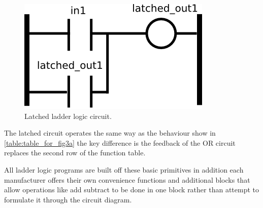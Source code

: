 \begin{figure}[h]
    \centering
    \includegraphics[width=\imgsmall]{./images/intro_fig_latched.png} 
    \caption{Latched ladder logic circuit.}
    \label{fig:intro_fig_latched}
\end{figure}

The latched circuit operates the same way as the behaviour show in \ref{table:table_for_fig3a} the key difference is the feedback of the OR circuit replaces the second row of the function table.

All ladder logic programs are built off these basic primitives in addition each manufacturer offers their own convenience functions and additional blocks that allow operations like add subtract to be done in one block rather than attempt to formulate it through the circuit diagram.
